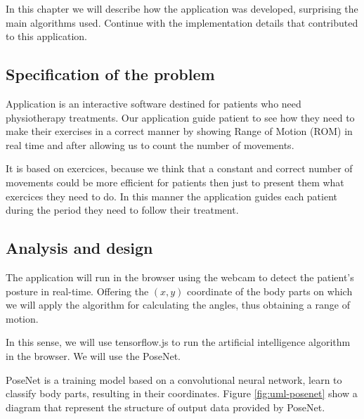 In this chapter we will describe how the application was developed, surprising the main algorithms used.
Continue with the implementation details that contributed to this application.


\subsection{Specification of the problem}

Application is an interactive software destined for patients who need physiotherapy
treatments. Our application guide patient to see how they need to make their exercises in 
a correct manner by showing Range of Motion (ROM) in real time and after allowing us to 
 count the number of movements. 
 
It is based on exercices, because we think that a constant and correct number of movements could be more efficient for patients then just to present them what exercices they need to do. In this manner the application guides each patient during the period they need to follow their treatment. 

\subsection{Analysis and design}

The application will run in the browser using the webcam to detect the patient's posture in real-time.
Offering the $(x, y)$ coordinate of the body parts on which we will apply the algorithm for calculating the angles, thus obtaining a range of motion.

In this sense, we will use tensorflow.js to run the artificial intelligence algorithm in the browser.
We will use the PoseNet.

PoseNet is a training model based on a convolutional neural network, learn to classify body parts, resulting in their coordinates. Figure \ref{fig:uml-posenet} show a diagram that represent the structure of output data provided by PoseNet.

